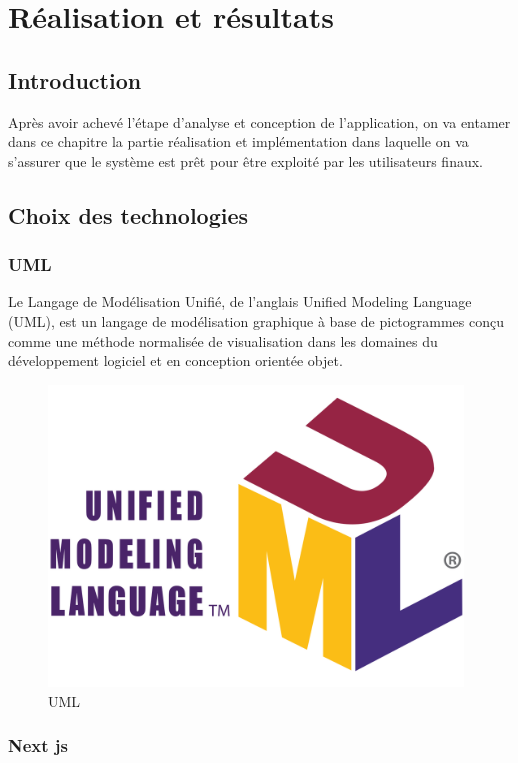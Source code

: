 \chapter{Réalisation et résultats}

\section{Introduction}

Après avoir achevé l’étape d’analyse et conception de l’application, on va entamer dans ce chapitre la partie réalisation et implémentation dans laquelle on va s’assurer que le système est prêt pour être exploité par les utilisateurs finaux.


\section{Choix des technologies}

\subsection{UML}

Le Langage de Modélisation Unifié, de l'anglais Unified Modeling Language (UML), est un langage de modélisation graphique à base de pictogrammes conçu comme une méthode normalisée de visualisation dans les domaines du développement logiciel et en conception orientée objet.

\begin{figure}[!h]
\begin{center}
\includegraphics[height=8cm]{UML.svg.png}
\end{center}
\caption{UML}
\end{figure}


\subsection{Next js}

